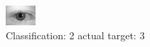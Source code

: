 \begin{figure}[h!]
\begin{center}
\includegraphics[width=0.60\columnwidth]{figures/ID559_class_2_target_3.png}
\end{center}
\caption{ Classification: 2 actual target: 3}
\label{fig:ID559_class_2_target_3}
\end{figure}
